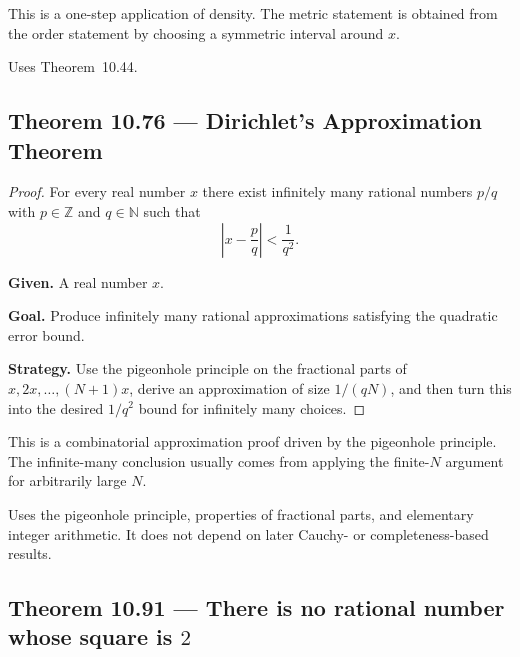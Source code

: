\begin{remark*}
This is a one-step application of density.  The metric statement is obtained from
the order statement by choosing a symmetric interval around $x$.
\end{remark*}

\begin{remark*}[Dependencies]
Uses Theorem~10.44.
\end{remark*}


\subsection*{Theorem 10.76 — Dirichlet's Approximation Theorem}
\label{prf:grep-dirichlet-approximation}

\begin{proof}
\Claim For every real number $x$ there exist infinitely many rational numbers $p/q$ with $p \in \mathbb{Z}$ and $q \in \mathbb{N}$ such that
\[
\left|x-\frac{p}{q}\right| < \frac{1}{q^2}.
\]

\textbf{Given.} A real number $x$.

\textbf{Goal.} Produce infinitely many rational approximations satisfying the quadratic error bound.

\textbf{Strategy.} Use the pigeonhole principle on the fractional parts of $x,2x,\dots,(N+1)x$, derive an approximation of size $1/(qN)$, and then turn this into the desired $1/q^2$ bound for infinitely many choices.


\end{proof}

\begin{remark*}
This is a combinatorial approximation proof driven by the pigeonhole principle.
The infinite-many conclusion usually comes from applying the finite-$N$ argument
for arbitrarily large $N$.
\end{remark*}

\begin{remark*}[Dependencies]
Uses the pigeonhole principle, properties of fractional parts, and elementary
integer arithmetic.  It does not depend on later Cauchy- or completeness-based
results.
\end{remark*}


\subsection*{Theorem 10.91 — There is no rational number whose square is $2$}
\label{prf:grep-sqrt-two-irrational}

